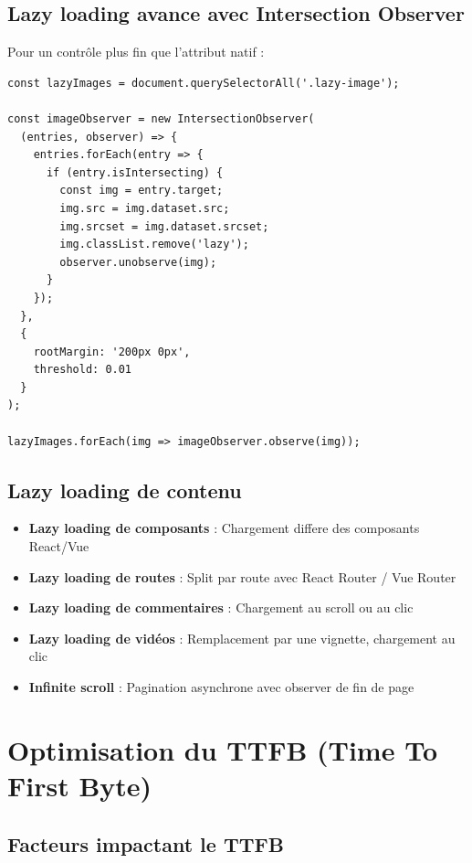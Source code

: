 \documentclass[12pt,a4paper,twoside]{report}
\begin{document}
\subsection{Lazy loading avance avec Intersection Observer}

Pour un contrôle plus fin que l'attribut natif :

\begin{lstlisting}[style=code,caption={Lazy loading avec Intersection Observer}]
const lazyImages = document.querySelectorAll('.lazy-image');

const imageObserver = new IntersectionObserver(
  (entries, observer) => {
    entries.forEach(entry => {
      if (entry.isIntersecting) {
        const img = entry.target;
        img.src = img.dataset.src;
        img.srcset = img.dataset.srcset;
        img.classList.remove('lazy');
        observer.unobserve(img);
      }
    });
  },
  {
    rootMargin: '200px 0px',
    threshold: 0.01
  }
);

lazyImages.forEach(img => imageObserver.observe(img));
\end{lstlisting}

\subsection{Lazy loading de contenu}

\begin{itemize}
    \item \textbf{Lazy loading de composants} : Chargement differe des composants React/Vue
    \item \textbf{Lazy loading de routes} : Split par route avec React Router / Vue Router
    \item \textbf{Lazy loading de commentaires} : Chargement au scroll ou au clic
    \item \textbf{Lazy loading de vidéos} : Remplacement par une vignette, chargement au clic
    \item \textbf{Infinite scroll} : Pagination asynchrone avec observer de fin de page
\end{itemize}

\section{Optimisation du TTFB (Time To First Byte)}

\subsection{Facteurs impactant le TTFB}
\end{document}
